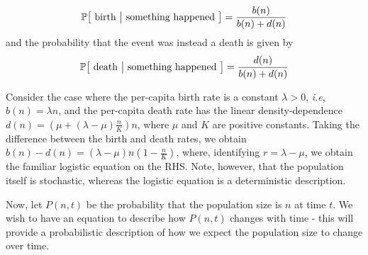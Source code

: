 \begin{equation*}
\mathbb{P\big[\textrm{ birth } \big{|} \textrm{ something happened }\big]} = \frac{b(n)}{b(n)+d(n)}
\end{equation*}
and the probability that the event was instead a death is given by
\begin{equation*}
\mathbb{P\big[\textrm{ death } \big{|} \textrm{ something happened }\big]} = \frac{d(n)}{b(n)+d(n)}
\end{equation*}
\begin{example}\label{ex_1D_stoch_logistic}
	Consider the case where the per-capita birth rate is a constant $\lambda > 0$, \emph{i.e}, $b(n) = \lambda n$, and the per-capita death rate has the linear density-dependence $d(n) = \left(\mu + (\lambda-\mu)\frac{n}{K}\right)n$, where $\mu$ and $K$ are positive constants. Taking the difference between the birth and death rates, we obtain $b(n) - d(n) = (\lambda - \mu)n\left(1-\frac{n}{K}\right)$, where, identifying $r=\lambda-\mu$, we obtain the familiar logistic equation on the RHS. Note, however, that the population itself is stochastic, whereas the logistic equation is a deterministic description.
\end{example}
Now, let $P(n,t)$ be the probability that the population size is $n$ at time $t$. We wish to have an equation to describe how $P(n,t)$ changes with time - this will provide a probabilistic description of how we expect the population size to change over time.

